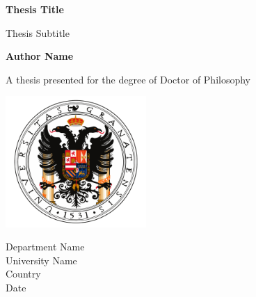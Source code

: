 \begin{titlepage}
    \begin{center}
        \vspace*{0.8cm}

        \Huge\textbf{Thesis Title}

        \vspace{0.4cm}

        \LARGE Thesis Subtitle

        \vspace{1.0cm}

        \textbf{Author Name}

        \vfill

        A thesis presented for the degree of Doctor of Philosophy

        \vspace{0.8cm}

        \includegraphics[width=0.4\textwidth]{figures/logos/logo_ugr.png}

        \Large
        Department Name\\
        University Name\\
        Country\\
        Date

    \end{center}
\end{titlepage}
